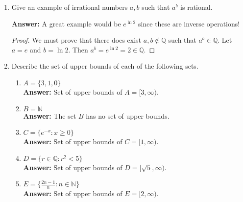 \documentclass{article}
\begin{document}
\begin{enumerate}
\begin{proof}
            \end{proof}
            
        \item Give an example of irrational numbers $a, b$ such that $a^b$ is rational.
        
            \textbf{Answer:} A great example would be $e ^ {\ln{2}}$ since these are inverse operations!
            
            \begin{proof}
                We must prove that there does exist $a,b \notin \mathbb{Q}$ such that $a^b \in \mathbb{Q}$. Let $a = e$ and $b = \ln{2}$. Then $a^b = e^{\ln{2}} = 2 \in \mathbb{Q}$.
                
            \end{proof}
        
        \item Describe the set of upper bounds of each of the following sets.
            \begin{enumerate}
                \item $A = \{3,1,0\}$\\
                    \textbf{Answer:} Set of upper bounds of $A = [3, \infty)$.\\
                    
                \item $B = \mathbb{N}$\\
                    \textbf{Answer:} The set $B$ has no set of upper bounds.\\
                    
                \item $C = \{e^{-x} : x \geq 0\}$\\
                    \textbf{Answer:} Set of upper bounds of $C = [1, \infty)$.\\
                    
                \item $D = \{r \in \mathbb{Q} : r^2 < 5\}$\\
                    \textbf{Answer:} Set of upper bounds of $D = [\sqrt{5}, \infty)$.\\
                    
                \item $E = \{\frac{2n-1}{n} : n \in \mathbb{N}\}$\\
                    \textbf{Answer:} Set of upper bounds of $E = [2, \infty)$.\\
                    

\end{enumerate}
\end{enumerate}
\end{document}
